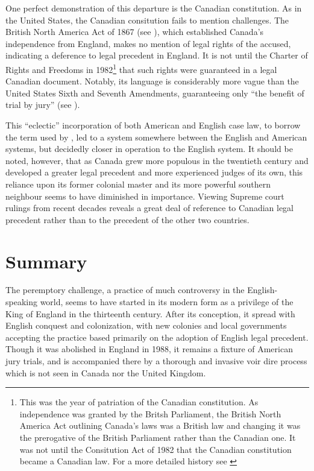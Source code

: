 One perfect demonstration of this departure is the Canadian constitution. As in the United States, the Canadian consitution fails
to mention challenges. The British North America Act of 1867 (see \cite{canadaconst}), which established Canada's independence from
England, makes no mention of legal rights of the accused, indicating a deference to legal precedent in England. It is not until
the Charter of Rights and Freedoms in 1982\footnote{This was the year of patriation of the Canadian constitution. As
  independence was granted by the Britsh Parliament, the British North America Act outlining Canada's laws was a British law and
  changing it was the prerogative of the British Parliament rather than the Canadian one. It was not until the Consitution Act of
  1982 that the Canadian constitution became a Canadian law. For a more detailed history see \cite{sheppard2018}} that such rights
were guaranteed in a legal Canadian document. Notably, its language is considerably more vague than the United States Sixth and
Seventh Amendments, guaranteeing only ``the benefit of trial by jury'' (see \cite{canadaconst}).

This ``eclectic'' incorporation of both American and English case law, to borrow the term used by \cite{brown2000}, led to a
system somewhere between the English and American systems, but decidedly closer in operation to the English system. It should be
noted, however, that as Canada grew more populous in the twentieth century and developed a greater legal precedent and more
experienced judges of its own, this reliance upon its former colonial master and its more powerful southern neighbour seems to
have diminished in importance. Viewing Supreme court rulings from recent decades reveals a great deal of reference to Canadian
legal precedent rather than to the precedent of the other two countries.

\section{Summary}

The peremptory challenge, a practice of much controversy in the English-speaking world, seems to have started in its modern form
as a privilege of the King of England in the thirteenth century. After its conception, it spread with English conquest and
colonization, with new colonies and local governments accepting the practice based primarily on the adoption of English legal
precedent. Though it was abolished in England in 1988, it remains a fixture of American jury trials, and is accompanied there by
a thorough and invasive voir dire process which is not seen in Canada nor the United Kingdom.

